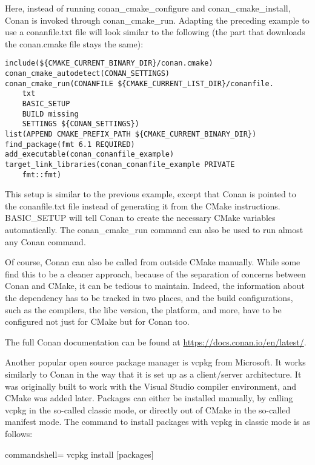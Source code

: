 Here, instead of running conan\_cmake\_configure and conan\_cmake\_install, Conan is invoked through conan\_cmake\_run. Adapting the preceding example to use a conanfile.txt file will look similar to the following (the part that downloads the conan.cmake file stays the same):

\begin{lstlisting}[style=styleCMake]
include(${CMAKE_CURRENT_BINARY_DIR}/conan.cmake)
conan_cmake_autodetect(CONAN_SETTINGS)
conan_cmake_run(CONANFILE ${CMAKE_CURRENT_LIST_DIR}/conanfile.
	txt
	BASIC_SETUP
	BUILD missing
	SETTINGS ${CONAN_SETTINGS})
list(APPEND CMAKE_PREFIX_PATH ${CMAKE_CURRENT_BINARY_DIR})
find_package(fmt 6.1 REQUIRED)
add_executable(conan_conanfile_example)
target_link_libraries(conan_conanfile_example PRIVATE
	fmt::fmt)
\end{lstlisting}

This setup is similar to the previous example, except that Conan is pointed to the conanfile.txt file instead of generating it from the CMake instructions. BASIC\_SETUP will tell Conan to create the necessary CMake variables automatically. The conan\_cmake\_run command can also be used to run almost any Conan command.

Of course, Conan can also be called from outside CMake manually. While some find this to be a cleaner approach, because of the separation of concerns between Conan and CMake, it can be tedious to maintain. Indeed, the information about the dependency has to be tracked in two places, and the build configurations, such as the compilers, the libc version, the platform, and more, have to be configured not just for CMake but for Conan too.

The full Conan documentation can be found at \url{https://docs.conan.io/en/latest/}.


Another popular open source package manager is vcpkg from Microsoft. It works similarly to Conan in the way that it is set up as a client/server architecture. It was originally built to work with the Visual Studio compiler environment, and CMake was added later. Packages can either be installed manually, by calling vcpkg in the so-called classic mode, or directly out of CMake in the so-called manifest mode. The command to install packages with vcpkg in classic mode is as follows:

\begin{tcblisting}{commandshell={}}
vcpkg install [packages]
\end{tcblisting}

